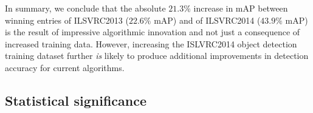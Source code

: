 In summary, we conclude that the absolute $21.3\%$ increase in mAP between winning entries of ILSVRC2013 ($22.6\%$ mAP) and of ILSVRC2014 ($43.9\%$ mAP) is the result of impressive algorithmic innovation and not just a consequence of increased training data. However, increasing the ISLVRC2014 object detection training dataset further \emph{is} likely to produce additional improvements in detection accuracy for current algorithms.

















\subsection{Statistical significance}
\label{sec:ResultsStats}



